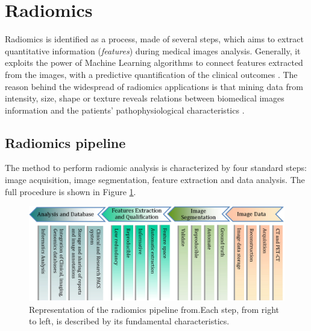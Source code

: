 \documentclass[../main.tex]{subfiles}
\begin{document}
\section{Radiomics}

Radiomics is identified as a process, made of several steps, which aims to extract quantitative information (\textit{features}) during medical images analysis. 
Generally, it exploits the power of Machine Learning algorithms to connect features extracted from the images, with a predictive quantification of the clinical outcomes \cite{kumar2012radiomics}.
The reason behind the widespread of radiomics applications is that
mining data from intensity, size, shape or texture reveals relations between biomedical images information and the patients' pathophysiological characteristics \cite{gillies2016radiomics-more-than-images}.


\subsection{Radiomics pipeline}\label{sec:radiomic-pipeline}

The method to perform radiomic analysis is characterized by four standard steps: image acquisition, image segmentation, feature extraction and data analysis. The full procedure is shown in Figure \ref{fig:radiomics_pipeline}.

\begin{figure}[H] 
\begin{center}
\includegraphics[height=0.8\textwidth,angle=-90]{images/radiomics_pipeline.jpg}
\caption{\small{Representation of the radiomics pipeline from\cite{kumar2012radiomics}.Each step, from right to left, is described by its fundamental characteristics.}}\label{fig:radiomics_pipeline}
\end{center}
\end{figure}
\end{document}
